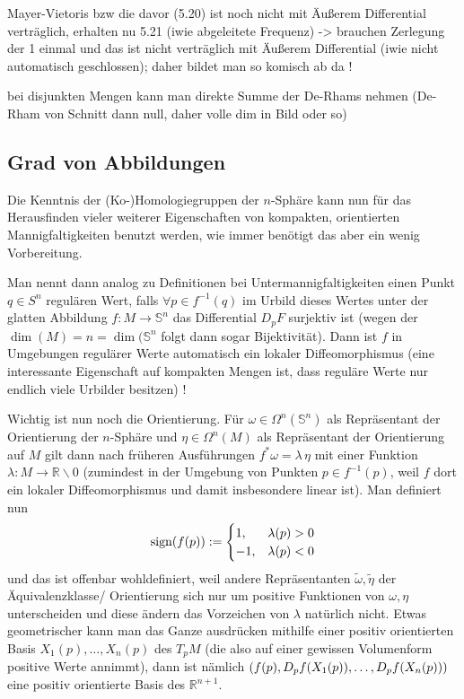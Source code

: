 \documentclass[../H_Analysis_main.tex]{subfiles}
\begin{document}
Mayer-Vietoris bzw die davor (5.20) ist noch nicht mit Äußerem Differential verträglich, erhalten nu 5.21 (iwie abgeleitete Frequenz) -> brauchen Zerlegung der 1 einmal und das ist nicht verträglich mit Äußerem Differential (iwie nicht automatisch geschlossen); daher bildet man so komisch ab da !

bei disjunkten Mengen kann man direkte Summe der De-Rhams nehmen (De-Rham von Schnitt dann null, daher volle dim in Bild oder so)



		\subsection{Grad von Abbildungen}
Die Kenntnis der (Ko-)Homologiegruppen der $n$-Sphäre kann nun für das Herausfinden vieler weiterer Eigenschaften von kompakten, orientierten Mannigfaltigkeiten benutzt werden, wie immer benötigt das aber ein wenig Vorbereitung.

Man nennt dann analog zu Definitionen bei Untermannigfaltigkeiten einen Punkt $q \in S^n$ regulären Wert, falls $\forall p \in f^{-1}(q)$ im Urbild dieses Wertes unter der glatten Abbildung $f: M \rightarrow \mathbb{S}^n$ das Differential $D_p F$ surjektiv ist (wegen der $\dim(M) = n = \dim(\mathbb{S}^n$ folgt dann sogar Bijektivität). Dann ist $f$ in Umgebungen regulärer Werte automatisch ein lokaler Diffeomorphismus (eine interessante Eigenschaft auf kompakten Mengen ist, dass reguläre Werte nur endlich viele Urbilder besitzen) !

Wichtig ist nun noch die Orientierung. Für $\omega \in \Omega^n(\mathbb{S}^n)$ als Repräsentant der Orientierung der $n$-Sphäre und $\eta \in \Omega^n(M)$ als Repräsentant der Orientierung auf $M$ gilt dann nach früheren Ausführungen $f^*\omega = \lambda \, \eta$ mit einer Funktion $\lambda: M \rightarrow \mathbb{R} \backslash \qty{0}$ (zumindest in der Umgebung von Punkten $p \in f^{-1}(p)$, weil $f$ dort ein lokaler Diffeomorphismus und damit insbesondere linear ist). Man definiert nun
\begin{equation}
\text{sign}\qty(f(p)) := \begin{cases} 1, & \lambda(p) > 0 \\ - 1, & \lambda(p) < 0 \end{cases}
\end{equation}
und das ist offenbar wohldefiniert, weil andere Repräsentanten $\tilde{\omega}, \tilde{\eta}$ der Äquivalenzklasse/ Orientierung sich nur um positive Funktionen von $\omega, \eta$ unterscheiden und diese ändern das Vorzeichen von $\lambda$ natürlich nicht. Etwas geometrischer kann man das Ganze ausdrücken mithilfe einer positiv orientierten Basis $X_1(p), \dots, X_n(p)$ des $T_p M$ (die also auf einer gewissen Volumenform positive Werte annimmt), dann ist nämlich $\qty(f(p), D_p f(X_1(p)), \dots, D_p f(X_n(p)))$ eine positiv orientierte Basis des $\mathbb{R}^{n + 1}$.
\end{document}
